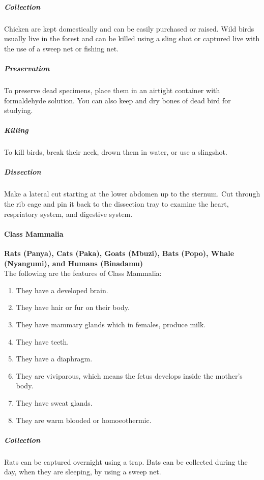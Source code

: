 \begin{multicols}{2}
%

\subparagraph{Collection}
Chicken are kept domestically and can be easily purchased or raised. Wild birds usually live in the forest and can be killed using a sling shot or captured live with the use of a sweep net or fishing net.

\subparagraph{Preservation} 
To preserve dead specimens, place them in an airtight container with formaldehyde solution. You can also keep and dry bones of dead bird for studying.

\subparagraph{Killing}
 To kill birds, break their neck, drown them in water, or use a slingshot.

\subparagraph{Dissection}
Make a lateral cut starting at the lower abdomen up to the sternum. Cut through the rib cage and pin it back to the dissection tray to examine the heart, respriatory system, and digestive system.

\paragraph{Class Mammalia} 
\textbf{Rats (Panya), Cats (Paka), Goats (Mbuzi), Bats (Popo), Whale (Nyangumi), and Humans (Binadamu)}\\
The following are the features of Class Mammalia:
\begin{enumerate}
\item{They have a developed brain.}
\item{They have hair or fur on their body.}
\item{They have mammary glands which in females, produce milk.}
\item{They have teeth.}
\item{They have a diaphragm.}
\item{They are viviparous, which means the fetus develops inside the mother’s body.}
\item{They have sweat glands.}
\item{They are warm blooded or homoeothermic.}
\end{enumerate}

\subparagraph{Collection}
Rats can be captured overnight using a trap. Bats can be collected during the day, when they are sleeping, by using a sweep net.


\end{multicols}
